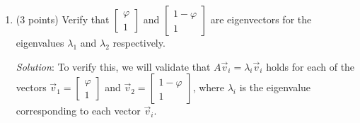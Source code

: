 \documentclass{article}
\begin{document}
\begin{enumerate}
        \begin{align*}
           & \lambda{_1} = \varphi = 1.618\ldots      \\
           & \lambda{_2} = 1 - \varphi = -0.618\ldots
        \end{align*}

  \item (3 points) Verify that $\begin{bmatrix} \varphi \\ 1 \end{bmatrix}$ and $\begin{bmatrix} 1 - \varphi \\ 1 \end{bmatrix}$ are eigenvectors for the eigenvalues $\lambda_1$ and $\lambda_2$ respectively.

        \emph{Solution}: To verify this, we will validate that $A\vec{v}_i=\lambda_i\vec{v}_i$ holds for each of the vectors $\vec{v}_1 = \begin{bmatrix} \varphi \\ 1 \end{bmatrix}$ and $\vec{v}_2 = \begin{bmatrix} 1 - \varphi \\ 1 \end{bmatrix}$, where $\lambda_i$ is the eigenvalue corresponding to each vector $\vec{v}_i$.


\end{enumerate}
\end{document}
